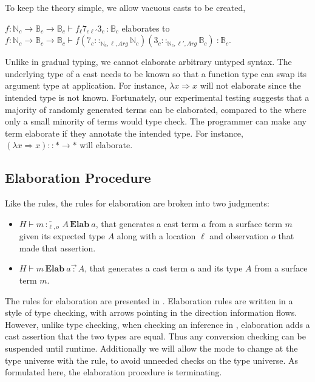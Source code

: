 To keep the theory simple, we allow vacuous casts to be created,
\begin{example}
$f:\mathbb{N}_c \rightarrow\mathbb{B}_c \rightarrow\mathbb{B}_c \vdash f_{\ell}7_{c\ell'}3_c \ :\mathbb{B}_c $ elaborates to $f:\mathbb{N}_c \rightarrow\mathbb{B}_c \rightarrow\mathbb{B}_c \vdash f\left(7_c ::_{\mathbb{N}_c,\ell,Arg}\mathbb{N}_c \right)\left(3_c ::_{\mathbb{N}_c,\ell',Arg}\mathbb{B}_c \right)\ :\mathbb{B}_c$.
\end{example}


Unlike in gradual typing, we cannot elaborate arbitrary untyped syntax.
The underlying type of a cast needs to be known so that a function type can swap its argument type at application.
For instance, $\lambda x\Rightarrow x$ will not elaborate since the intended type is not known.
Fortunately, our experimental testing suggests that a majority of randomly generated terms can be elaborated, compared to the \slang{} where only a small minority of terms would type check.
The programmer can make any term elaborate if they annotate the intended type.
For instance, $\left(\lambda x\Rightarrow x\right)::*\rightarrow*$ will elaborate.

\subsection{Elaboration Procedure}

Like the \bidir{} rules, the rules for elaboration are broken into two judgments:
\begin{itemize}
\item $H\vdash m\overleftarrow{\,:_{\ell,o}\,}A\,\textbf{Elab}\ a$, that generates a cast term $a$ from a surface term $m$ given its expected type $A$ along with a location $\ell$ and observation $o$ that made that assertion.
\item $H\vdash m\,\textbf{Elab}\ a\overrightarrow{\,:\,}A$, that generates a cast term $a$ and its type $A$ from a surface term $m$.
\end{itemize}
The rules for elaboration are presented in .
Elaboration rules are written in a style of \bidir{} type checking, with arrows pointing in the direction information flows.
However, unlike \bidir{} type checking, when checking an inference in , elaboration adds a cast assertion that the two types are equal.
Thus any conversion checking can be suspended until runtime.
Additionally we will allow the mode to change at the type universe with the  rule, to avoid unneeded checks on the type universe.
As formulated here, the elaboration procedure is terminating.

